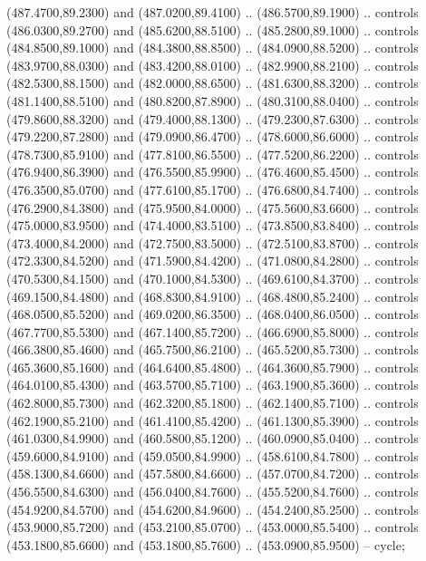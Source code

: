 {\begin{scope}[y=0.80pt, x=0.80pt, yscale=-1, xscale=1, inner sep=0pt, outer sep=0pt, #1]
      (487.4700,89.2300) and (487.0200,89.4100) .. (486.5700,89.1900) .. controls
      (486.0300,89.2700) and (485.6200,88.5100) .. (485.2800,89.1000) .. controls
      (484.8500,89.1000) and (484.3800,88.8500) .. (484.0900,88.5200) .. controls
      (483.9700,88.0300) and (483.4200,88.0100) .. (482.9900,88.2100) .. controls
      (482.5300,88.1500) and (482.0000,88.6500) .. (481.6300,88.3200) .. controls
      (481.1400,88.5100) and (480.8200,87.8900) .. (480.3100,88.0400) .. controls
      (479.8600,88.3200) and (479.4000,88.1300) .. (479.2300,87.6300) .. controls
      (479.2200,87.2800) and (479.0900,86.4700) .. (478.6000,86.6000) .. controls
      (478.7300,85.9100) and (477.8100,86.5500) .. (477.5200,86.2200) .. controls
      (476.9400,86.3900) and (476.5500,85.9900) .. (476.4600,85.4500) .. controls
      (476.3500,85.0700) and (477.6100,85.1700) .. (476.6800,84.7400) .. controls
      (476.2900,84.3800) and (475.9500,84.0000) .. (475.5600,83.6600) .. controls
      (475.0000,83.9500) and (474.4000,83.5100) .. (473.8500,83.8400) .. controls
      (473.4000,84.2000) and (472.7500,83.5000) .. (472.5100,83.8700) .. controls
      (472.3300,84.5200) and (471.5900,84.4200) .. (471.0800,84.2800) .. controls
      (470.5300,84.1500) and (470.1000,84.5300) .. (469.6100,84.3700) .. controls
      (469.1500,84.4800) and (468.8300,84.9100) .. (468.4800,85.2400) .. controls
      (468.0500,85.5200) and (469.0200,86.3500) .. (468.0400,86.0500) .. controls
      (467.7700,85.5300) and (467.1400,85.7200) .. (466.6900,85.8000) .. controls
      (466.3800,85.4600) and (465.7500,86.2100) .. (465.5200,85.7300) .. controls
      (465.3600,85.1600) and (464.6400,85.4800) .. (464.3600,85.7900) .. controls
      (464.0100,85.4300) and (463.5700,85.7100) .. (463.1900,85.3600) .. controls
      (462.8000,85.7300) and (462.3200,85.1800) .. (462.1400,85.7100) .. controls
      (462.1900,85.2100) and (461.4100,85.4200) .. (461.1300,85.3900) .. controls
      (461.0300,84.9900) and (460.5800,85.1200) .. (460.0900,85.0400) .. controls
      (459.6000,84.9100) and (459.0500,84.9900) .. (458.6100,84.7800) .. controls
      (458.1300,84.6600) and (457.5800,84.6600) .. (457.0700,84.7200) .. controls
      (456.5500,84.6300) and (456.0400,84.7600) .. (455.5200,84.7600) .. controls
      (454.9200,84.5700) and (454.6200,84.9600) .. (454.2400,85.2500) .. controls
      (453.9000,85.7200) and (453.2100,85.0700) .. (453.0000,85.5400) .. controls
      (453.1800,85.6600) and (453.1800,85.7600) .. (453.0900,85.9500) -- cycle;


\end{scope}}
